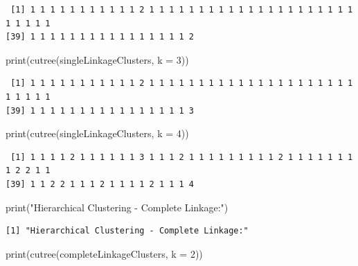 \documentclass[
  letterpaper,
  DIV=11,
  numbers=noendperiod]{scrartcl}
\newenvironment{Shaded}{}{}
\newcommand{\AttributeTok}[1]{\textcolor[rgb]{0.84,0.60,0.13}{#1}}
\newcommand{\DecValTok}[1]{\textcolor[rgb]{0.96,0.45,0.00}{#1}}
\newcommand{\FunctionTok}[1]{\textcolor[rgb]{0.41,0.62,0.42}{#1}}
\newcommand{\NormalTok}[1]{\textcolor[rgb]{0.24,0.22,0.21}{#1}}
\newcommand{\StringTok}[1]{\textcolor[rgb]{0.60,0.59,0.10}{#1}}
\begin{document}
\begin{verbatim}
 [1] 1 1 1 1 1 1 1 1 1 1 1 2 1 1 1 1 1 1 1 1 1 1 1 1 1 1 1 1 1 1 1 1 1 1 1 1 1 1
[39] 1 1 1 1 1 1 1 1 1 1 1 1 1 1 1 1 2
\end{verbatim}

\begin{Shaded}
\begin{Highlighting}[]
\FunctionTok{print}\NormalTok{(}\FunctionTok{cutree}\NormalTok{(singleLinkageClusters, }\AttributeTok{k =} \DecValTok{3}\NormalTok{))}
\end{Highlighting}
\end{Shaded}

\begin{verbatim}
 [1] 1 1 1 1 1 1 1 1 1 1 1 2 1 1 1 1 1 1 1 1 1 1 1 1 1 1 1 1 1 1 1 1 1 1 1 1 1 1
[39] 1 1 1 1 1 1 1 1 1 1 1 1 1 1 1 1 3
\end{verbatim}

\begin{Shaded}
\begin{Highlighting}[]
\FunctionTok{print}\NormalTok{(}\FunctionTok{cutree}\NormalTok{(singleLinkageClusters, }\AttributeTok{k =} \DecValTok{4}\NormalTok{))}
\end{Highlighting}
\end{Shaded}

\begin{verbatim}
 [1] 1 1 1 1 2 1 1 1 1 1 1 3 1 1 1 2 1 1 1 1 1 1 1 1 1 2 1 1 1 1 1 1 1 1 2 2 1 1
[39] 1 1 2 2 1 1 1 2 1 1 1 1 2 1 1 1 4
\end{verbatim}

\begin{Shaded}
\begin{Highlighting}[]
\FunctionTok{print}\NormalTok{(}\StringTok{"Hierarchical Clustering {-} Complete Linkage:"}\NormalTok{)}
\end{Highlighting}
\end{Shaded}

\begin{verbatim}
[1] "Hierarchical Clustering - Complete Linkage:"
\end{verbatim}

\begin{Shaded}
\begin{Highlighting}[]
\FunctionTok{print}\NormalTok{(}\FunctionTok{cutree}\NormalTok{(completeLinkageClusters, }\AttributeTok{k =} \DecValTok{2}\NormalTok{))}
\end{Highlighting}
\end{Shaded}
\end{document}
